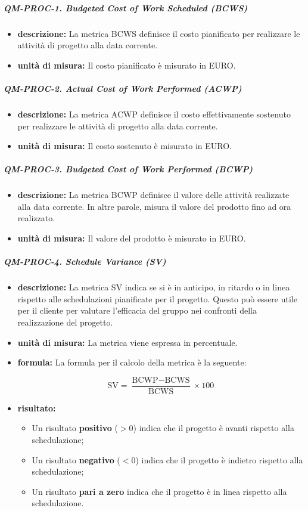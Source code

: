 			\subparagraph{QM-PROC-1. Budgeted Cost of Work Scheduled (BCWS)}
			\begin{itemize}
				\item \textbf{descrizione: }
				La metrica BCWS definisce il costo pianificato per realizzare le attività di progetto alla data corrente.

				\item \textbf{unità di misura: }
				Il costo pianificato è misurato in EURO.
			\end{itemize}
			\subparagraph{QM-PROC-2. Actual Cost of Work Performed (ACWP)}
			\begin{itemize}
				\item \textbf{descrizione: }
				La metrica ACWP definisce il costo effettivamente sostenuto per realizzare le attività di progetto alla data corrente.

				\item \textbf{unità di misura: }
				Il costo sostenuto è misurato in EURO.
			\end{itemize}
			\subparagraph{QM-PROC-3. Budgeted Cost of Work Performed (BCWP)}
			\begin{itemize}
				\item \textbf{descrizione: }
				La metrica BCWP definisce il valore delle attività realizzate alla data corrente. In altre parole, misura il valore del prodotto fino ad ora realizzato.

				\item \textbf{unità di misura: }
				Il valore del prodotto è misurato in EURO.
			\end{itemize}
			\subparagraph{QM-PROC-4. Schedule Variance (SV)}
			\begin{itemize}
				\item \textbf{descrizione: }
				La metrica SV indica se si è in anticipo, in ritardo o in linea rispetto alle schedulazioni pianificate per il progetto. Questo può essere utile per il cliente per valutare l'efficacia del gruppo nei confronti della realizzazione del progetto.

				\item \textbf{unità di misura: }
				La metrica viene espressa in percentuale.

				\item \textbf{formula: }
				La formula per il calcolo della metrica è la seguente:

				\[
					\text{SV} = \frac{\text{BCWP} - \text{BCWS}}{\text{BCWS}} \times 100
				\]

				\item \textbf{risultato: }
				\begin{itemize}
					\item Un risultato \textbf{positivo} (\(> 0\)) indica che il progetto è avanti rispetto alla schedulazione;
					\item Un risultato \textbf{negativo} (\(< 0\)) indica che il progetto è indietro rispetto alla schedulazione;
					\item Un risultato \textbf{pari a zero} indica che il progetto è in linea rispetto alla schedulazione.
				\end{itemize}
			\end{itemize}
